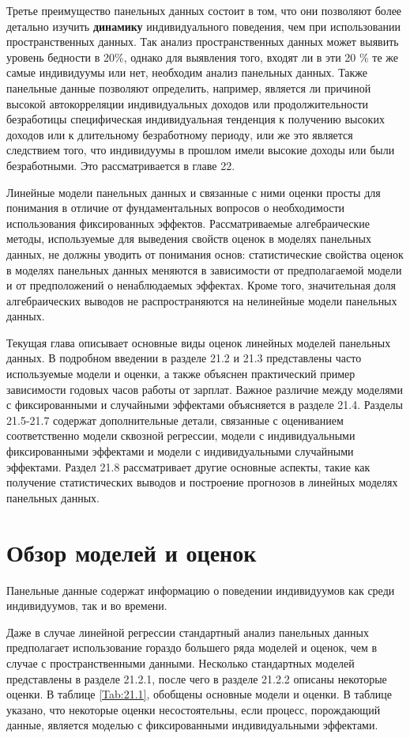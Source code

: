 Третье преимущество панельных данных состоит в том, что они позволяют более детально изучить \textbf{динамику} индивидуального поведения, чем при использовании пространственных данных. Так анализ пространственных данных может выявить уровень бедности в 20\%, однако для выявления того, входят ли в эти 20 \% те же самые индивидуумы или нет, необходим анализ панельных данных. Также панельные данные позволяют определить, например, является ли  причиной высокой автокорреляции индивидуальных доходов или продолжительности безработицы
специфическая индивидуальная тенденция к получению высоких доходов или к длительному безработному периоду, или же это является следствием того, что индивидуумы в прошлом имели высокие доходы или были безработными. Это рассматривается в главе 22.

Линейные модели панельных данных и связанные с ними оценки просты для понимания в отличие от фундаментальных вопросов о необходимости использования фиксированных эффектов. Рассматриваемые алгебраические методы, используемые для выведения свойств оценок в моделях панельных данных, не должны уводить от понимания основ: статистические свойства оценок в моделях панельных данных меняются в зависимости от предполагаемой модели и от предположений о ненаблюдаемых эффектах. Кроме того, значительная доля алгебраических выводов не распространяются на нелинейные модели панельных данных.

Текущая глава описывает основные виды оценок линейных моделей панельных данных. В подробном введении в разделе 21.2 и 21.3 представлены часто используемые модели и оценки, а также объяснен практический пример зависимости годовых часов работы от зарплат. Важное различие между моделями с фиксированными и случайными эффектами объясняется в разделе 21.4. Разделы 21.5-21.7 содержат дополнительные детали, связанные с оцениванием соответственно модели сквозной регрессии, модели с индивидуальными фиксированными эффектами и модели с индивидуальными случайными эффектами. Раздел 21.8 рассматривает другие основные аспекты, такие как получение статистических выводов и построение прогнозов в линейных моделях панельных данных.

\section{Обзор моделей и оценок}
Панельные данные содержат информацию о поведении индивидуумов как среди индивидуумов, так и во времени. 

Даже в случае линейной регрессии стандартный анализ панельных данных предполагает использование гораздо большего ряда моделей и оценок, чем в случае с пространственными данными. Несколько стандартных моделей представлены в разделе 21.2.1, после чего в разделе 21.2.2 описаны некоторые оценки. В таблице \ref{Tab:21.1}, обобщены основные модели и оценки. В таблице указано, что некоторые оценки несостоятельны, если процесс, порождающий данные, является моделью с фиксированными индивидуальными эффектами.

